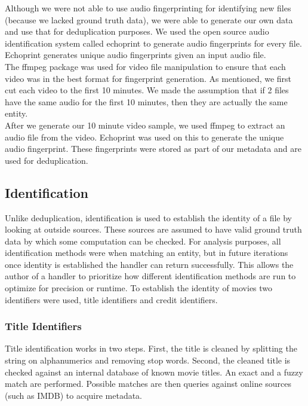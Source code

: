 \documentclass[paper=a4, fontsize=11pt]{scrartcl} %
\numberwithin{equation}{section} %
\numberwithin{figure}{section} %
\numberwithin{table}{section} %
\begin{document}
Although we were not able to use audio fingerprinting for identifying new files (because we lacked ground truth data), we were able to generate our own data and use that for deduplication purposes. We used the open source audio identification system called echoprint to generate audio fingerprints for every file. Echoprint generates unique audio fingerprints given an input audio file.  \\

The ffmpeg package was used for video file manipulation to ensure that each video was in the best format for fingerprint generation. As mentioned, we first cut each video to the first 10 minutes. We made the assumption that if 2 files have the same audio for the first 10 minutes, then they are actually the same entity. \\

After we generate our 10 minute video sample, we used ffmpeg to extract an audio file from the video. Echoprint was used on this to generate the unique audio fingerprint. These fingerprints were stored as part of our metadata and are used for deduplication.  \\



\subsection{Identification}
\label{sec:identification}
Unlike deduplication, identification is used to establish the identity of a file by looking at outside sources. These sources are assumed to have valid ground truth data by which some computation can be checked. For analysis purposes, all identification methods were when matching an entity, but in future iterations once identity is established the handler can return successfully. This allows the author of a handler to prioritize how different identification methods are run to optimize for precision or runtime. To establish the identity of movies two identifiers were used, title identifiers and credit identifiers. \\

\subsubsection{Title Identifiers}
\label{sec:title-identifier}

Title identification works in two steps. First, the title is cleaned by splitting the string on alphanumerics and removing stop words. Second, the cleaned title is checked against an internal database of known movie titles. An exact and a fuzzy match are performed. Possible matches are then queries against online sources (such as IMDB) to acquire metadata. \\
\end{document}
